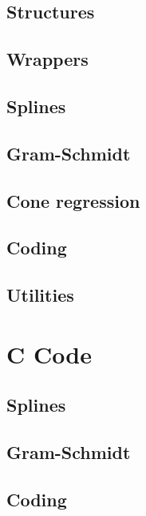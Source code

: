 \documentclass[
  12pt,
]{book}
\begin{document}
\subsection{Structures}\label{structures-1}

\subsection{Wrappers}\label{wrappers-1}

\subsection{Splines}\label{splines}

\subsection{Gram-Schmidt}\label{gram-schmidt}

\subsection{Cone regression}\label{cone-regression}

\subsection{Coding}\label{coding}

\subsection{Utilities}\label{utilities}

\section{C Code}\label{c-code}

\subsection{Splines}\label{splines-1}

\subsection{Gram-Schmidt}\label{gram-schmidt-1}

\subsection{Coding}\label{coding-1}
\end{document}

